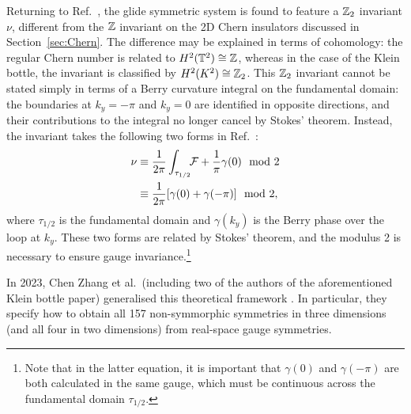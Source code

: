 Returning to Ref.~\cite{CYZ_Klein-gauge}, the glide symmetric system is found to feature a $\mathbb{Z}_2$ invariant $\nu$, different from the $\mathbb{Z}$ invariant on the 2D Chern insulators discussed in Section~\ref{sec:Chern}. The difference may be explained in terms of cohomology: the regular Chern number is related to $H^2(\mathbb{T}^2)\cong\mathbb{Z}$, whereas in the case of the Klein bottle, the invariant is classified by $H^2(K^2)\cong\mathbb{Z}_2$. This $\mathbb{Z}_2$ invariant cannot be stated simply in terms of a Berry curvature integral on the fundamental domain: the boundaries at $k_y=-\pi$ and $k_y=0$ are identified in opposite directions, and their contributions to the integral no longer cancel by Stokes' theorem. Instead, the invariant takes the following two forms in Ref.~\cite{CYZ_Klein-gauge}:
\begin{align}
	\nu &\equiv \frac{1}{2\pi}\int_{\tau_{1/2}}\!\!\mathcal{F} + \frac{1}{\pi}\gamma(0) \mod 2 \label{eq:z2-inv1} \\
		&\equiv \frac{1}{2\pi}[\gamma(0) + \gamma(-\pi)]\mod 2, \label{eq:z2-inv2}
\end{align}
where $\tau_{1/2}$ is the fundamental domain and $\gamma(k_y)$ is the Berry phase over the loop at $k_y$. These two forms are related by Stokes' theorem, and the modulus 2 is necessary to ensure gauge invariance.\footnote{
	Note that in the latter equation, it is important that $\gamma(0)$ and $\gamma(-\pi)$ are both calculated in the same gauge, which must be continuous across the fundamental domain $\tau_{1/2}$.}

In 2023, Chen Zhang et al.\ (including two of the authors of the aforementioned Klein bottle paper) generalised this theoretical framework \cite{Zhang_nonsymmorphic}. In particular, they specify how to obtain all 157 non-symmorphic symmetries in three dimensions (and all four in two dimensions) from real-space gauge symmetries.

